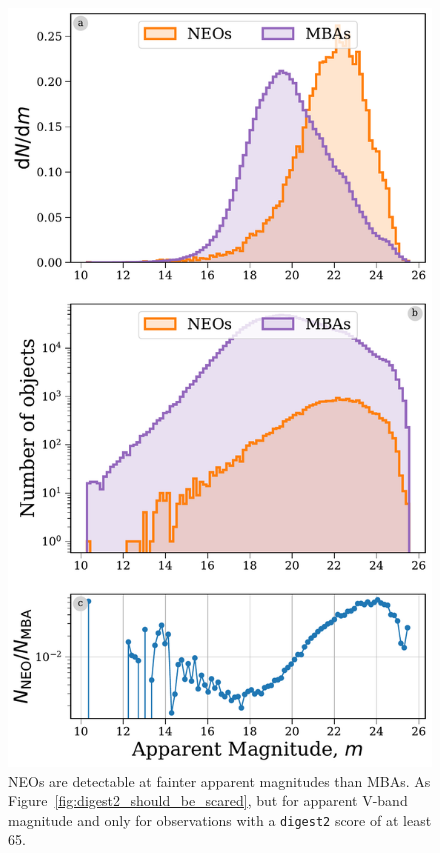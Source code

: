 \documentclass[twocolumn]{aastex631}
\newcommand{\dig}{\texttt{digest2}}
\begin{document}
\begin{figure}[htb]
    \centering
    \includegraphics[width=\columnwidth]{figures/apparent_mag_dist_highscore.pdf}
    \caption{NEOs are detectable at fainter apparent magnitudes than MBAs. As Figure~\ref{fig:digest2_should_be_scared}, but for apparent V-band magnitude and only for observations with a \dig{} score of at least 65.}
    \label{fig:app_mag_highscore}
\end{figure}
\end{document}
